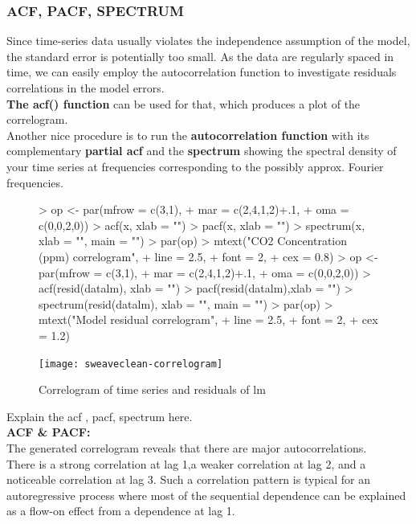\documentclass[11pt, a4paper]{article} %
\begin{document}
\subsubsection{ACF, PACF, SPECTRUM}
\noindent Since time-series data usually violates the independence assumption of the model, the standard error is potentially too small. As the data are regularly spaced in time, we can easily employ the autocorrelation function to investigate residuals correlations in the model errors.\\
\textbf{The acf() function} can be used for that, which produces a plot of the correlogram.\\
Another nice procedure is to run the \textbf{autocorrelation  function} with its complementary \textbf{partial acf} and the \textbf{spectrum}  showing the spectral density of your time series at frequencies corresponding to the possibly approx. Fourier frequencies. \\ 

\begin{figure}[H]
\centering
\begin{Schunk}
\begin{Sinput}
> op <- par(mfrow = c(3,1),
+           mar = c(2,4,1,2)+.1,
+           oma = c(0,0,2,0))
> acf(x, xlab = "")
> pacf(x, xlab = "")
> spectrum(x, xlab = "", main = "")
> par(op)
> mtext("CO2 Concentration (ppm) correlogram", 
+       line = 2.5, 
+       font = 2, 
+       cex = 0.8)
> op <- par(mfrow = c(3,1),
+           mar = c(2,4,1,2)+.1,
+           oma = c(0,0,2,0))
> acf(resid(datalm), xlab = "")
> pacf(resid(datalm),xlab = "")
> spectrum(resid(datalm), xlab = "", main = "")
> par(op)
> mtext("Model residual correlogram", 
+       line = 2.5, 
+       font = 2, 
+       cex = 1.2)
\end{Sinput}
\end{Schunk}
\texttt{[image: sweaveclean-correlogram]}
\caption{Correlogram of time series and residuals of lm}
\label{correlogram}
\end{figure}


Explain the acf , pacf, spectrum here. \\
\textbf{ACF \& PACF:}\\
\noindent The generated correlogram  reveals that there are major autocorrelations. \\
There is a strong correlation at lag 1,a weaker correlation at lag 2, and a noticeable correlation at lag 3. Such a correlation pattern is typical for an autoregressive process where most of the sequential dependence can be explained as a  flow-on effect from a dependence at lag 1.\\
\end{document}
